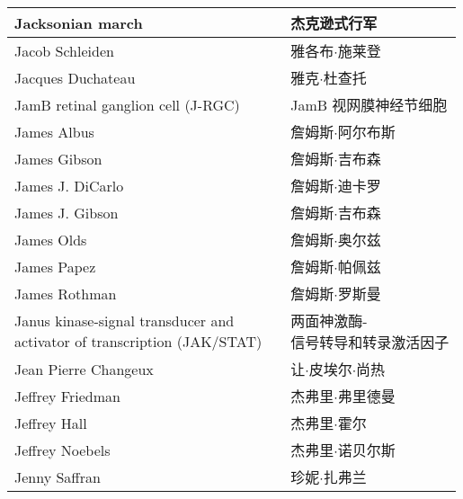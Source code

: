 \begin{longtable}{lll}
	\midrule
	Jacksonian march   && 杰克逊式行军  \\
	
	\midrule
	Jacob Schleiden   && 雅各布$\cdot$施莱登  \\
	
	\midrule
	Jacques Duchateau   && 雅克$\cdot$杜查托  \\
	
	\midrule
	JamB retinal ganglion cell (J-RGC)   && JamB 视网膜神经节细胞  \\
	
	\midrule
	James Albus   && 詹姆斯$\cdot$阿尔布斯  \\
	
	\midrule
	James Gibson   && 詹姆斯$\cdot$吉布森  \\
	
	\midrule
	James J. DiCarlo   && 詹姆斯$\cdot$迪卡罗  \\
	
	\midrule
	James J. Gibson   && 詹姆斯$\cdot$吉布森  \\
	
	\midrule
	James Olds   && 詹姆斯$\cdot$奥尔兹  \\
	
	\midrule
	James Papez   && 詹姆斯$\cdot$帕佩兹  \\
	
	\midrule
	James Rothman   && 詹姆斯$\cdot$罗斯曼  \\
	
	\midrule
	\makecell[l]{Janus kinase-signal transducer and \\activator of transcription (JAK/STAT)}  && \makecell[l]{两面神激酶-\\信号转导和转录激活因子}  \\
	
	\midrule
	Jean Pierre Changeux   && 让$\cdot$皮埃尔$\cdot$尚热  \\
	
	\midrule
	Jeffrey Friedman   && 杰弗里$\cdot$弗里德曼  \\
	
	\midrule
	Jeffrey Hall   && 杰弗里$\cdot$霍尔  \\
	
	\midrule
	Jeffrey Noebels   && 杰弗里$\cdot$诺贝尔斯  \\
	
	\midrule
	Jenny Saffran   && 珍妮$\cdot$扎弗兰  \\
	

\end{longtable}
